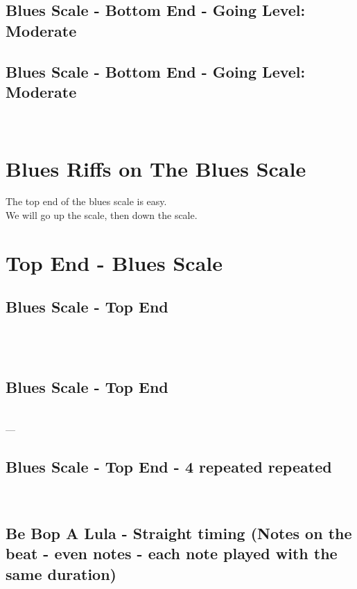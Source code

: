                 \subsection*{Blues Scale - Bottom End - Going \Uparrow Level: Moderate}
                    \2\3\four\4
                    
                \subsection*{Blues Scale - Bottom End - Going \Downarrow Level: Moderate}
                    \4\four\3\2 \\
                
        
\newpage 

\section{Blues Riffs on The Blues Scale}
    The top end of the blues scale is easy. 
    \\ We will go up the scale, then down the scale. \Uparrow \Downarrow
        \section*{Top End - Blues Scale}
            \subsection*{Blues Scale - Top End \Uparrow}
                \4\5\six\\ \\
                
            \subsection*{Blues Scale - Top End \Downarrow}
                \six\5\4 \\
---         \subsection*{Blues Scale - Top End - 4 repeated repeated \Downarrow}
                \six\5\4\4 \\
                \six\5\4\4

            \subsection*{Be Bop A Lula - Straight timing (Notes on the beat - even notes - each note played with the same duration)}
                \six \5 \4 \5 \six \\
                
